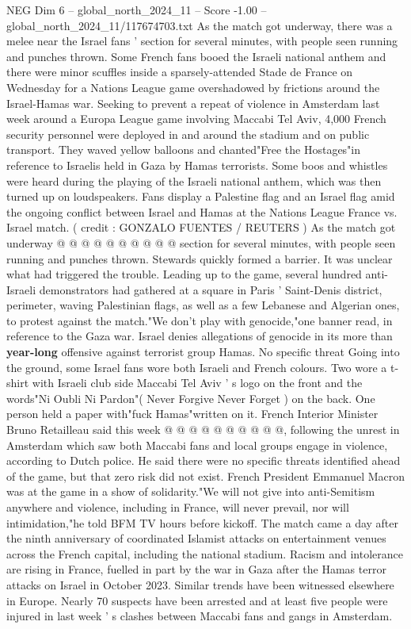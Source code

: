 \begin{textsample}{NEG Dim 6 – global\_north\_2024\_11 – Score -1.00 – global\_north\_2024\_11/117674703.txt}  \label{ex:f6_neg_161}
As the match got underway, there was a melee near the Israel fans ' section for several minutes, with people seen running and punches thrown.
Some French fans booed the Israeli national anthem and there were minor scuffles inside a sparsely-attended Stade de France on Wednesday for a Nations League game overshadowed by frictions around the Israel-Hamas war.
Seeking to prevent a repeat of violence in Amsterdam last week around a Europa League game involving Maccabi Tel Aviv, 4,000 French security personnel were deployed in and around the stadium and on public transport.
They waved yellow balloons and chanted"Free the Hostages"in reference to Israelis held in Gaza by Hamas terrorists.
Some boos and whistles were heard during the playing of the Israeli national anthem, which was then turned up on loudspeakers.
Fans display a Palestine flag and an Israel flag amid the ongoing conflict between Israel and Hamas at the Nations League France vs.
Israel match. ( credit : GONZALO FUENTES / REUTERS ) As the match got underway @ @ @ @ @ @ @ @ @ @ section for several minutes, with people seen running and punches thrown.
Stewards quickly formed a barrier.
It was unclear what had triggered the trouble.
Leading up to the game, several hundred anti-Israeli demonstrators had gathered at a square in Paris ' Saint-Denis district, perimeter, waving Palestinian flags, as well as a few Lebanese and Algerian ones, to protest against the match."We don't play with genocide,"one banner read, in reference to the Gaza war.
Israel denies allegations of genocide in its more than \textbf{year-long} offensive against terrorist group Hamas.
No specific threat Going into the ground, some Israel fans wore both Israeli and French colours.
Two wore a t-shirt with Israeli club side Maccabi Tel Aviv ' s logo on the front and the words"Ni Oubli Ni Pardon"( Never Forgive Never Forget ) on the back.
One person held a paper with"fuck Hamas"written on it.
French Interior Minister Bruno Retailleau said this week @ @ @ @ @ @ @ @ @ @, following the unrest in Amsterdam which saw both Maccabi fans and local groups engage in violence, according to Dutch police.
He said there were no specific threats identified ahead of the game, but that zero risk did not exist.
French President Emmanuel Macron was at the game in a show of solidarity."We will not give into anti-Semitism anywhere and violence, including in France, will never prevail, nor will intimidation,"he told BFM TV hours before kickoff.
The match came a day after the ninth anniversary of coordinated Islamist attacks on entertainment venues across the French capital, including the national stadium.
Racism and intolerance are rising in France, fuelled in part by the war in Gaza after the Hamas terror attacks on Israel in October 2023.
Similar trends have been witnessed elsewhere in Europe.
Nearly 70 suspects have been arrested and at least five people were injured in last week ' s clashes between Maccabi fans and gangs in Amsterdam.

\end{textsample}
